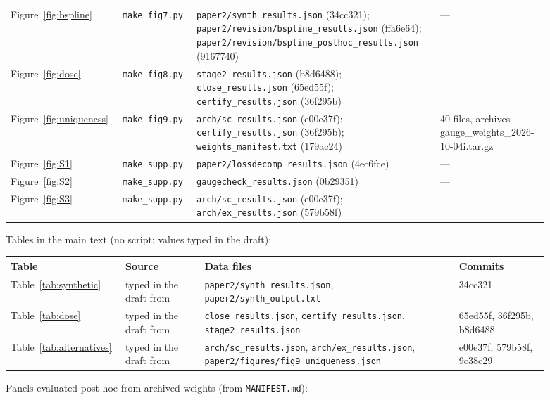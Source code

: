{\begin{longtable}{R{0.15\linewidth} R{0.13\linewidth} R{0.42\linewidth} R{0.19\linewidth}}
Figure~\ref{fig:bspline}  & \texttt{make\_\allowbreak{}fig7.py} & \texttt{paper2/\allowbreak{}synth\_\allowbreak{}results.json} (34cc321); \texttt{paper2/\allowbreak{}revision/\allowbreak{}bspline\_\allowbreak{}results.json} (ffa6e64); \texttt{paper2/\allowbreak{}revision/\allowbreak{}bspline\_\allowbreak{}posthoc\_\allowbreak{}results.json} (9167740) & --- \\
Figure~\ref{fig:dose}  & \texttt{make\_\allowbreak{}fig8.py} & \texttt{stage2\_\allowbreak{}results.json} (b8d6488); \texttt{close\_\allowbreak{}results.json} (65ed55f); \texttt{certify\_\allowbreak{}results.json} (36f295b) & --- \\
Figure~\ref{fig:uniqueness}  & \texttt{make\_\allowbreak{}fig9.py} & \texttt{arch/\allowbreak{}sc\_\allowbreak{}results.json} (e00e37f); \texttt{certify\_\allowbreak{}results.json} (36f295b); \texttt{weights\_\allowbreak{}manifest.txt} (179ac24) & 40 files, archives gauge\_weights\_2026-10-04i.tar.gz \\
Figure~\ref{fig:S1}  & \texttt{make\_\allowbreak{}supp.py} & \texttt{paper2/\allowbreak{}lossdecomp\_\allowbreak{}results.json} (4ec6fce) & --- \\
Figure~\ref{fig:S2}  & \texttt{make\_\allowbreak{}supp.py} & \texttt{gaugecheck\_\allowbreak{}results.json} (0b29351) & --- \\
Figure~\ref{fig:S3}  & \texttt{make\_\allowbreak{}supp.py} & \texttt{arch/\allowbreak{}sc\_\allowbreak{}results.json} (e00e37f); \texttt{arch/\allowbreak{}ex\_\allowbreak{}results.json} (579b58f) & --- \\
\bottomrule
\end{longtable}}
\noindent Tables in the main text (no script; values typed in the draft):

{\footnotesize\setlength{\tabcolsep}{3pt}
\begin{longtable}{R{0.14\linewidth} R{0.14\linewidth} R{0.45\linewidth} R{0.16\linewidth}}
\toprule
Table & Source & Data files & Commits \\
\midrule
\endhead
Table~\ref{tab:synthetic} & typed in the draft from & \texttt{paper2/synth\_results.json}, \texttt{paper2/synth\_output.txt} & 34cc321 \\
Table~\ref{tab:dose} & typed in the draft from & \texttt{close\_results.json}, \texttt{certify\_results.json}, \texttt{stage2\_results.json} & 65ed55f, 36f295b, b8d6488 \\
Table~\ref{tab:alternatives} & typed in the draft from & \texttt{arch/sc\_results.json}, \texttt{arch/ex\_results.json}, \texttt{paper2/figures/fig9\_uniqueness.json} & e00e37f, 579b58f, 9c38c29 \\
\bottomrule
\end{longtable}}
\noindent Panels evaluated post hoc from archived weights (from \texttt{MANIFEST.md}):

